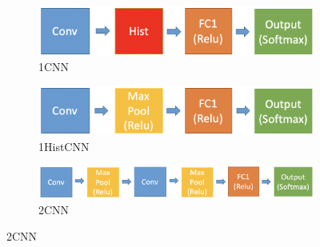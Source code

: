 \documentclass[10pt,twocolumn,letterpaper]{article}
\begin{document}
\begin{figure}[htb]
	\centering
	\begin{subfigure}[b]{.30\textwidth}
		\centering
		\includegraphics[width=\textwidth]{1CNN.png}
		\caption{1CNN}
	\end{subfigure}
	\hfill
	\begin{subfigure}[b]{.30\textwidth}
		\centering
		\includegraphics[width=\textwidth]{1HistCNN.png}
		\caption{1HistCNN}
	\end{subfigure}
	\hfill
	\begin{subfigure}[b]{.30\textwidth}
		\centering
		\includegraphics[width=\textwidth]{2CNN.png}
		\caption{2CNN}
	\end{subfigure}
	

\end{figure}
\end{document}
